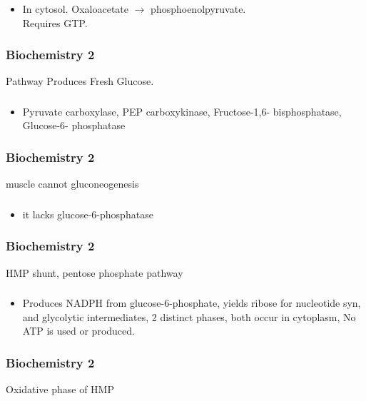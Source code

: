 \documentclass[11pt]{beamer}
\begin{document}
\begin{frame}
 \frametitle{}
\begin{itemize}
\item In cytosol. Oxaloacetate ${\rightarrow}$ phosphoenolpyruvate. \\ Requires GTP.
\end{itemize}
\end{frame}

\begin{frame}
 \frametitle{Biochemistry 2}
Pathway Produces Fresh Glucose.
\end{frame}

\begin{frame}
 \frametitle{}
\begin{itemize}
\item Pyruvate carboxylase, PEP carboxykinase, Fructose-1,6- bisphosphatase, Glucose-6- phosphatase
\end{itemize}
\end{frame}

\begin{frame}
 \frametitle{Biochemistry 2}
muscle cannot gluconeogenesis
\end{frame}

\begin{frame}
 \frametitle{}
\begin{itemize}
\item  it lacks glucose-6-phosphatase
\end{itemize}
\end{frame}

\begin{frame}
 \frametitle{Biochemistry 2}
HMP shunt, pentose phosphate pathway
\end{frame}

\begin{frame}
 \frametitle{}
\begin{itemize}
\item Produces NADPH from glucose-6-phosphate, yields ribose for nucleotide syn, and glycolytic intermediates, 2 distinct phases, both occur in cytoplasm, No ATP is used or produced. 
\end{itemize}
\end{frame}

\begin{frame}
 \frametitle{Biochemistry 2}
Oxidative phase of HMP 
\end{frame}
\end{document}

